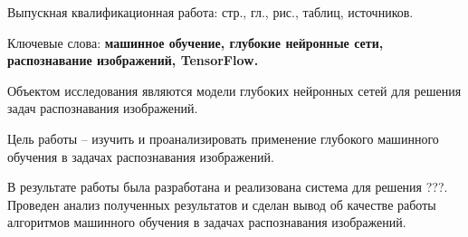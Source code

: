 
Выпускная квалификационная работа: \pageref{LastPage} стр., 
 гл., 
\totalfigures{} рис.,
\totaltables{} таблиц,
 источников.

Ключевые слова: \textbf{машинное обучение, глубокие нейронные сети, распознавание изображений, TensorFlow.}

Объектом исследования являются модели глубоких нейронных сетей для решения задач распознавания изображений. 

Цель работы – изучить и проанализировать применение глубокого машинного обучения в задачах распознавания изображений.

В результате работы была разработана и реализована система для решения ???. Проведен анализ полученных результатов и сделан вывод об качестве работы алгоритмов машинного обучения в задачах распознавания изображений.

\clearpage